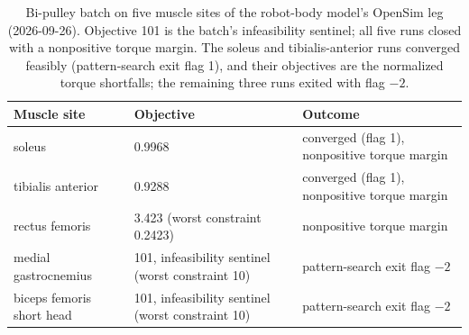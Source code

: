 \begin{table}[htbp]
\caption{Bi-pulley batch on five muscle sites of the robot-body model's OpenSim leg (2026-09-26). Objective 101 is the batch's infeasibility sentinel; all five runs closed with a nonpositive torque margin. The soleus and tibialis-anterior runs converged feasibly (pattern-search exit flag 1), and their objectives are the normalized torque shortfalls; the remaining three runs exited with flag $-2$.}
\label{tab:bipulley_batch}
\begin{tabular}{@{}lll@{}}
\toprule
\textbf{Muscle site} & \textbf{Objective} & \textbf{Outcome} \\
\midrule
soleus                    & 0.9968                                       & converged (flag 1), nonpositive torque margin \\
tibialis anterior         & 0.9288                                       & converged (flag 1), nonpositive torque margin \\
rectus femoris            & 3.423 (worst constraint 0.2423)              & nonpositive torque margin \\
medial gastrocnemius      & 101, infeasibility sentinel (worst constraint 10) & pattern-search exit flag $-2$ \\
biceps femoris short head & 101, infeasibility sentinel (worst constraint 10) & pattern-search exit flag $-2$ \\
\bottomrule
\end{tabular}
\end{table}

